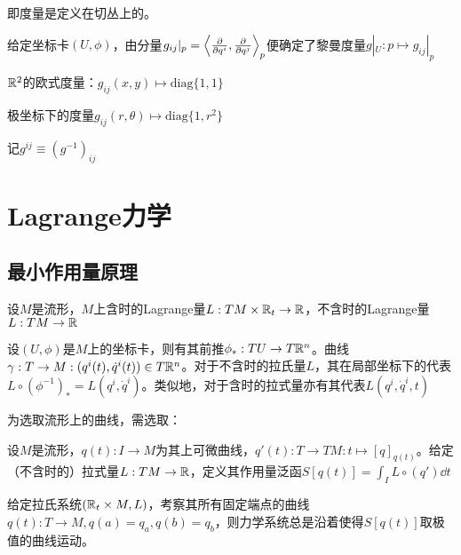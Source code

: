 \documentclass{ctexbook}
\begin{document}
即度量是定义在切丛上的。

给定坐标卡$(U,\phi)$，由分量$g_{ij}|_{p}=\left<\frac{\partial }{\partial q^{i}},\frac{\partial }{\partial q^{j}}\right>_{p}$便确定了黎曼度量$g|_{U}:p\mapsto g_{ij}|_{p}$

\begin{Eg}
  $\mathbb{R}^{2}$的欧式度量：$g_{ij}(x,y)\mapsto \mathrm{diag}\{1,1\}$

  极坐标下的度量$g_{ij}(r,\theta)\mapsto \mathrm{diag}\{1,r^{2}\}$
\end{Eg}

记$g^{ij}\equiv (g^{-1})_{ij}$

\chapter{Lagrange力学}
\section{最小作用量原理}
\begin{Def}[拉氏量]
  设$M$是流形，$M$上含时的Lagrange量$L:TM\times \mathbb{R}_{t}\to \mathbb{R}$，不含时的Lagrange量$L:TM\to\mathbb{R}$
\end{Def}

设$(U,\phi)$是$M$上的坐标卡，则有其前推$\phi_{*}:TU\to T\mathbb{R}^{n}$。曲线$\gamma:T\to M:(q^{i}(t),\dot q^{i}(t))\in T\mathbb{R}^{n}$。对于不含时的拉氏量$L$，其在局部坐标下的代表$L\circ(\phi^{-1})_{*}=L(q^{i},\dot q^{i})$。类似地，对于含时的拉式量亦有其代表$L(q^{i},\dot q^{i},t)$

为选取流形上的曲线，需选取：
\begin{Def}
  设$M$是流形，$q(t):I\to M$为其上可微曲线，$q'(t):T\to TM:t\mapsto [q]_{q(t)}$。给定（不含时的）拉式量$L:TM\to\mathbb{R}$，定义其作用量泛函$S[q(t)]=\int_{I}L\circ (q')\dd t$
\end{Def}

\begin{Thm}[最小作用量原理]
  给定拉氏系统$(\mathbb{R}_{t}\times M,L)$，考察其所有固定端点的曲线$q(t):T\to M,q(a)=q_{a},q(b)=q_{b}$，则力学系统总是沿着使得$S[q(t)]$取极值的曲线运动。
\end{Thm}
\end{document}
